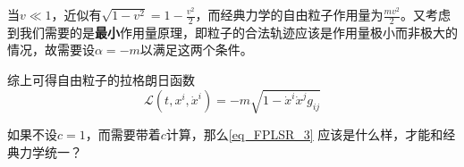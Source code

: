 当$v\ll 1$，近似有$\sqrt{1-v^2}=1-\frac{v^2}{2}$，而经典力学的自由粒子作用量为$\frac{mv^2}{2}$。又考虑到我们需要的是\textbf{最小}作用量原理，即粒子的合法轨迹应该是作用量极小而非极大的情况，故需要设$\alpha=-m$以满足这两个条件。

综上可得自由粒子的拉格朗日函数
\begin{equation}\label{eq_FPLSR_3}
\mathcal{L}(t, x^i, \dot{x}^i) = -m\sqrt{1-\dot{x}^i\dot{x}^jg_{ij}}
\end{equation}

\begin{exercise}{}
如果不设$c=1$，而需要带着$c$计算，那么\autoref{eq_FPLSR_3} 应该是什么样，才能和经典力学统一？
\end{exercise}